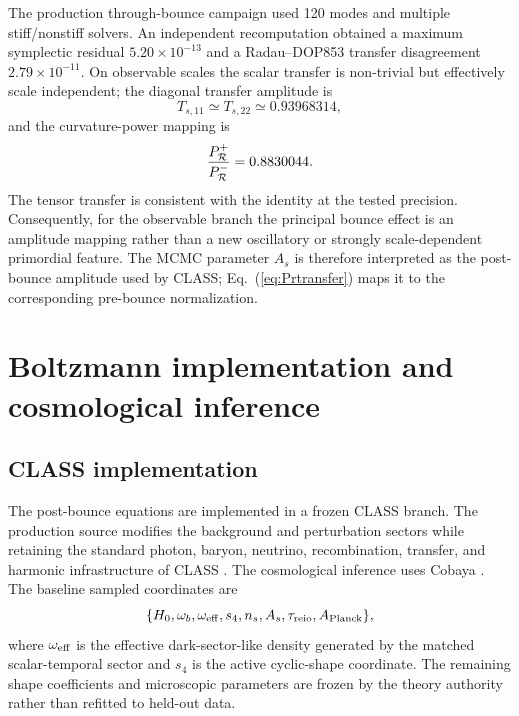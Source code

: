 \documentclass[12pt]{iopart}
\begin{document}
The production through-bounce campaign used 120 modes and multiple stiff/nonstiff solvers.  An independent recomputation obtained a maximum symplectic residual $5.20\times10^{-13}$ and a Radau--DOP853 transfer disagreement $2.79\times10^{-11}$.  On observable scales the scalar transfer is non-trivial but effectively scale independent; the diagonal transfer amplitude is
\begin{equation}
T_{s,11}\simeq T_{s,22}\simeq0.93968314,
\end{equation}
and the curvature-power mapping is
\begin{equation}
\frac{P_{\cal R}^{+}}{P_{\cal R}^{-}}=0.8830044.
\label{eq:Prtransfer}
\end{equation}
The tensor transfer is consistent with the identity at the tested precision.  Consequently, for the observable branch the principal bounce effect is an amplitude mapping rather than a new oscillatory or strongly scale-dependent primordial feature.  The MCMC parameter $A_s$ is therefore interpreted as the post-bounce amplitude used by CLASS; Eq.~(\ref{eq:Prtransfer}) maps it to the corresponding pre-bounce normalization.

\section{Boltzmann implementation and cosmological inference}
\label{sec:observations}

\subsection{CLASS implementation}

The post-bounce equations are implemented in a frozen CLASS branch.  The production source modifies the background and perturbation sectors while retaining the standard photon, baryon, neutrino, recombination, transfer, and harmonic infrastructure of CLASS \cite{BlasLesgourguesTram2011}.  The cosmological inference uses Cobaya \cite{TorradoLewis2021}.  The baseline sampled coordinates are
\begin{equation}
\{H_0,\omega_b,\omega_{\rm eff},s_4,n_s,A_s,\tau_{\rm reio},A_{\rm Planck}\},
\end{equation}
where $\omega_{\rm eff}$ is the effective dark-sector-like density generated by the matched scalar-temporal sector and $s_4$ is the active cyclic-shape coordinate.  The remaining shape coefficients and microscopic parameters are frozen by the theory authority rather than refitted to held-out data.
\end{document}

